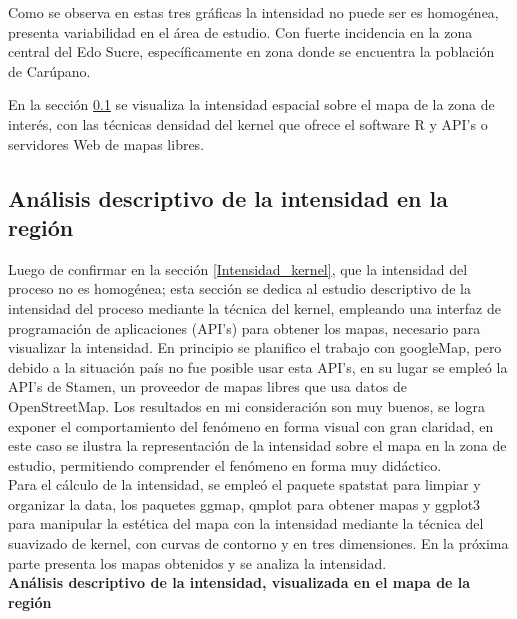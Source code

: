 \documentclass[12pt]{report}
\begin{document}
{{{{{{{{{{{{{{{				
 Como se observa en estas tres gráficas la intensidad no puede ser es homogénea, presenta variabilidad en el área de estudio. Con fuerte incidencia en la zona central del Edo Sucre, específicamente en zona donde se encuentra la población de Carúpano.
		
		
 En la  sección \ref{APIs} se visualiza la intensidad espacial sobre el mapa de la zona de interés, con las técnicas densidad del kernel que ofrece el  software R y API's o servidores Web de mapas libres.  
		

  \subsection{Análisis descriptivo de la intensidad en la región}\label{APIs}

   Luego de  confirmar en la sección \ref{Intensidad_kernel}, que la intensidad del proceso no es homogénea; esta sección  se dedica al estudio descriptivo de la intensidad del proceso mediante la técnica del kernel, empleando una interfaz de programación de aplicaciones (API's) para obtener los mapas, necesario para visualizar  la intensidad. En principio se planifico el trabajo con googleMap, pero debido a la situación país no fue posible usar esta API’s, en su lugar se empleó la API’s  de Stamen, un proveedor de mapas libres que usa datos de OpenStreetMap. Los resultados en mi consideración son  muy buenos, se logra exponer el comportamiento del fenómeno en forma visual con gran claridad, en este caso se ilustra la representación de la intensidad sobre el mapa en la  zona de estudio, permitiendo comprender el fenómeno en forma muy didáctico.\\


   Para el cálculo de la intensidad, se empleó  el paquete spatstat para limpiar y organizar la data, los paquetes ggmap, qmplot para obtener mapas y ggplot3 para manipular la estética del mapa con la intensidad mediante la técnica del suavizado de kernel, con curvas de contorno y en tres dimensiones. En la próxima parte presenta los mapas obtenidos y se analiza la intensidad.\\


 \textbf{Análisis descriptivo de la intensidad, visualizada en el mapa de la región}\\

}}}}}}}}}}}}}}}
\end{document}
